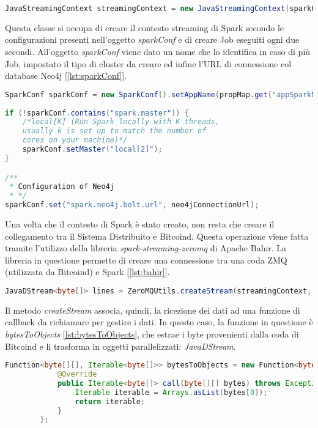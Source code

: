 \begin{itemize}
\begin{lstlisting}[language=Java, label=lst:intiSpark, caption={Inizializzazione Spark Streaming.}]
JavaStreamingContext streamingContext = new JavaStreamingContext(sparkConf, new Duration(2000));
\end{lstlisting}

Questa classe si occupa di creare il contesto streaming di Spark secondo le configurazioni presenti nell'oggetto \textit{sparkConf} e di creare Job eseguiti ogni due secondi. All'oggetto \textit{sparkConf} viene dato un nome che lo identifica in caso di più Job, impostato il tipo di cluster da creare ed infine l'URL di connessione col database Neo4j [\ref{lst:sparkConf}].

\begin{lstlisting}[language=Java, label=lst:sparkConf, caption={Creazione oggetto sparkConf.}]
SparkConf sparkConf = new SparkConf().setAppName(propMap.get("appSparkName"));
					
if (!sparkConf.contains("spark.master")) {
	/*local[K] (Run Spark locally with K threads, 
	usually k is set up to match the number of 
	cores on your machine)*/
	sparkConf.setMaster("local[2]"); 
}

/**
 * Configuration of Neo4j
 * */
sparkConf.set("spark.neo4j.bolt.url", neo4jConnectionUrl);
\end{lstlisting}

Una volta che il contesto di Spark è stato creato, non resta che creare il collegamento tra il Sistema Distribuito e Bitcoind. Questa operazione viene fatta tramite l'utilizzo della libreria \textit{spark-streaming-zeromq} di Apache Bahir. La libreria in questione permette di creare una connessione tra una coda ZMQ (utilizzata da Bitcoind) e Spark [\ref{lst:bahir}].

\begin{lstlisting}[language=Java, label=lst:bahir, caption={Metodo della libreria Spark Streaming ZeroMQ.}]
JavaDStream<byte[]> lines = ZeroMQUtils.createStream(streamingContext, host, subscribe, bytesToObjects );
\end{lstlisting}

Il metodo \textit{createStream} associa, quindi, la ricezione dei dati ad una funzione di callback da richiamare per gestire i dati. In questo caso, la funzione in questione è \textit{bytesToObjects} \ref{lst:bytesToObjects}, che estrae i byte provenienti dalla coda di Bitcoind e li trasforma in oggetti parallelizzati: \textit{JavaDStream}.

\begin{lstlisting}[language=Java, label=lst:bytesToObjects, caption={Funzione bytesToObjects.}]
Function<byte[][], Iterable<byte[]>> bytesToObjects = new Function<byte[][], Iterable<byte[]>>() {
            @Override
            public Iterable<byte[]> call(byte[][] bytes) throws Exception {
                Iterable iterable = Arrays.asList(bytes[0]);
                return iterable;
            }
        };
\end{lstlisting}


\end{itemize}
